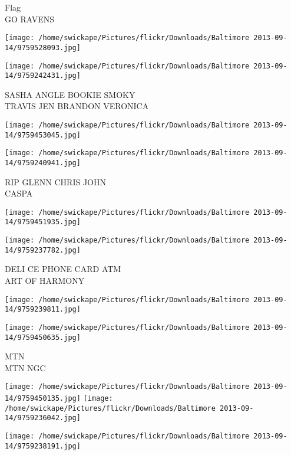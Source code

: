 \documentclass[10pt,letterpaper]{article}
\begin{document}
Flag\\
GO RAVENS\\
\pagebreak

\texttt{[image: /home/swickape/Pictures/flickr/Downloads/Baltimore 2013-09-14/9759528093.jpg]}

\vspace{0.25in}
\texttt{[image: /home/swickape/Pictures/flickr/Downloads/Baltimore 2013-09-14/9759242431.jpg]}

SASHA ANGLE BOOKIE SMOKY\\
TRAVIS JEN BRANDON VERONICA\\
\pagebreak

\texttt{[image: /home/swickape/Pictures/flickr/Downloads/Baltimore 2013-09-14/9759453045.jpg]}

\vspace{0.25in}
\texttt{[image: /home/swickape/Pictures/flickr/Downloads/Baltimore 2013-09-14/9759240941.jpg]}

RIP GLENN CHRIS JOHN\\
CASPA\\
\pagebreak

\texttt{[image: /home/swickape/Pictures/flickr/Downloads/Baltimore 2013-09-14/9759451935.jpg]}

\vspace{0.25in}
\texttt{[image: /home/swickape/Pictures/flickr/Downloads/Baltimore 2013-09-14/9759237782.jpg]}

DELI CE PHONE CARD ATM\\
ART OF HARMONY\\
\pagebreak

\texttt{[image: /home/swickape/Pictures/flickr/Downloads/Baltimore 2013-09-14/9759239811.jpg]}

\vspace{0.25in}
\texttt{[image: /home/swickape/Pictures/flickr/Downloads/Baltimore 2013-09-14/9759450635.jpg]}

MTN\\
MTN NGC\\
\pagebreak

\texttt{[image: /home/swickape/Pictures/flickr/Downloads/Baltimore 2013-09-14/9759450135.jpg]}
\texttt{[image: /home/swickape/Pictures/flickr/Downloads/Baltimore 2013-09-14/9759236042.jpg]}

\vspace{0.25in}
\texttt{[image: /home/swickape/Pictures/flickr/Downloads/Baltimore 2013-09-14/9759238191.jpg]}
\end{document}

